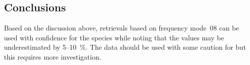 \subsection{Conclusions}
\label{sec:fm08:conclusions}
Based on the discussion above, retrievals based on frequency mode~08 can be
used with confidence for the species  while noting that the values
may be underestimated by 5--10~\%.  The data  should be used with some caution
for  but this requires more investigation.

